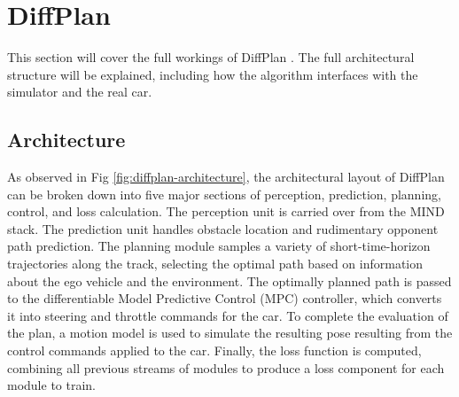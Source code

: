 \chapter{DiffPlan}
\label{chapter:DiffPlan}

This section will cover the full workings of DiffPlan \cite{swadiryus_DifferentiableMotionPlanning_2025, koch_DifferentiableInterpretablePath_2025}.
The full architectural structure will be explained, including how the algorithm interfaces with the simulator and the real car.

\section{Architecture}
\label{section:DiffPlanArchitecture}

As observed in Fig \ref{fig:diffplan-architecture}, the architectural layout of DiffPlan can be broken down into five major sections of perception, prediction, planning, control, and loss calculation.
The perception unit is carried over from the MIND stack.
The prediction unit handles obstacle location and rudimentary opponent path prediction.
The planning module samples a variety of short-time-horizon trajectories along the track, selecting the optimal path based on information about the ego vehicle and the environment.
The optimally planned path is passed to the differentiable Model Predictive Control (MPC) controller, which converts it into steering and throttle commands for the car.
To complete the evaluation of the plan, a motion model is used to simulate the resulting pose resulting from the control commands applied to the car.
Finally, the loss function is computed, combining all previous streams of modules to produce a loss component for each module to train.

